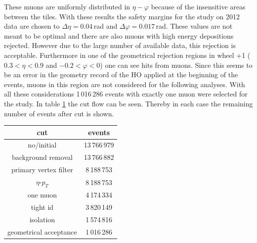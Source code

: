 			These muons are uniformly distributed in $\eta-\varphi$ because of the insensitive areas between the tiles.
			With these results the safety margins for the study on 2012 data are chosen to $\Delta\eta = 0.04$\,rad and $\Delta\varphi = 0.017$\,rad.
			These values are not meant to be optimal and there are also muons with high energy depositions rejected.
			However due to the large number of available data, this rejection is acceptable.
			Furthermore in one of the geometrical rejection regions in wheel +1 ($0.3<\eta<0.9$ and $-0.2<\varphi<0$) one can see hits from muons.
			Since this seems to be an error in the geometry record of the HO applied at the beginning of the events, muons in this region are not considered for the following analyses.
			With all these considerations 1\,016\,286 events with exactly one muon were selected for the study.
			In table \ref{CutFlow} the cut flow can be seen.
			Thereby in each case the remaining number of events after cut is shown.
			\begin{table}[htbH]
				\begin{center}
				\label{CutFlow}
					\begin{tabular}{|c|c|}
						\hline
						\textbf{cut}           & \textbf{events}    \\ \hline \hline
			 			no/initial             & 13\,766\,979 		\\ \hline
			 			background removal     & 13\,766\,882 		\\ \hline
			 			primary vertex filter  &  8\,188\,753 		\\ \hline
			 			$\eta$-$p_T$           &  8\,188\,753 		\\ \hline
			 			one muon               &  4\,174\,334 		\\ \hline
			 			tight id               &  3\,820\,149 		\\ \hline
			 			isolation              &  1\,574\,816 		\\ \hline
			 			geometrical acceptance &  1\,016\,286 		\\ \hline
					\end{tabular}
				\end{center}
			\end{table}
